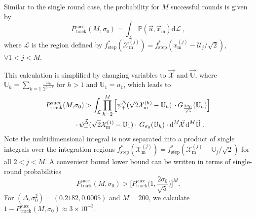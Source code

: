 \documentclass[prx,reprint,superscriptaddress,longbibliography,floatfix,nofootinbib]{revtex4-1}
\begin{document}
Similar to the single round case, the probability for $M$ successful rounds is given by 
\begin{equation}
    P^{\text{succ}}_{\text{track}}(M,\sigma_0) = \int_{\mathcal{L}}  \mathbb{P}(\vec{u},\vec{x}_\text{m}) \text{d}\mathcal{L} \ ,
\end{equation}
where $\mathcal{L}$ is the region defined by $f^{*}_{\text{step}}(\mathcal{X}^{(j)}_\text{m}) = f^{*}_{\text{step}}(x^{(j)}_\text{m}-\mathcal{U}_j/\sqrt{2})$, $\forall 1<j<M$.

This calculation is simplified by changing variables to $\vec{\mathcal{X}}$ and $\vec{\mathbb{U}}$, where $\displaystyle\mathbb{U}_h = \sum_{k=1}\frac{u_k}{2^{h-k}}$ for $h>1$ and $\mathbb{U}_1 = u_1$, which leads to 
\begin{equation}
\begin{split}
       P^{\text{succ}}_{\text{track}}(M, & \sigma_0) >  \int_{\mathcal{L}}   \prod_{h=2}^{M}\Big[ \psi^{\vec{\Delta}}_{+}(\sqrt{2}\mathcal{X}^{(h)}_{\text{m}}-\mathbb{U}_h) \hspace{0.05cm} 
      \cdot G_{\frac{2\sigma_0}{\sqrt{5}}}(\mathbb{U}_h)\Big]
       \\ & 
      \cdot \psi^{\vec{\Delta}}_{+}(\sqrt{2}\mathcal{X}^{(1)}_{\text{m}}-\mathbb{U}_1) \cdot \hspace{0.05cm} G_{\sigma_0}(\mathbb{U}_h)
       \cdot \text{d}^{M}\hspace{-0.05cm}\vec{\mathcal{X}} \hspace{0.05cm}\text{d}^{M}\vec{\mathbb{U}} \ .
       \end{split}
\end{equation}
Note the multidimensional integral is now separated into a product of single integrals over the integration regions $f^{*}_{\text{step}}(\mathcal{X}^{(j)}_\text{m}) = f^{*}_{\text{step}}({\mathcal{X}^{(j)}_\text{m}-\mathbb{U}_j/\sqrt{2}})$ for all $2<j<M$. A convenient bound lower bound can be written in terms of single-round probabilities
\begin{equation}
\label{eq:multitrack}
           P^{\text{succ}}_{\text{track}}(M,\sigma_0) > \Big[P^{\text{succ}}_{\text{track}}\Big(1,\frac{2\sigma_0}{\sqrt{5}}\Big)\Big]^{M}.
\end{equation}
\noindent For $(\Delta,\sigma_0^2) = (0.2182,0.0005)$ and $M=200$, we calculate $1-P^{\text{succ}}_{\text{track}}(M,\sigma_0) \approx 3\times10^{-3}$.  

\end{document}
